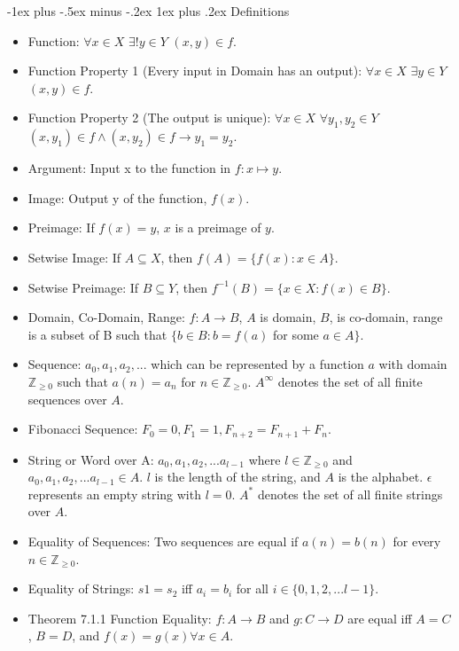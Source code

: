 \documentclass[10pt, portrait]{article}
\makeatletter
\renewcommand{\subsection}{\@startsection{subsection}{3}{0mm}%
                                {-1ex plus -.5ex minus -.2ex}%
                                {1ex plus .2ex}%
                                {\normalfont\small\bfseries}}%
\makeatother
\begin{document}
\begin{multicols*}{2}
\subsection{Definitions}
\begin{itemize}
    \item Function: $\forall x \in X$ $\exists! y \in Y$ $(x, y) \in f$.
    \item Function Property 1 (Every input in Domain has an output): $\forall x \in X$ $\exists y \in Y$ $(x, y) \in f$.
    \item Function Property 2 (The output is unique): $\forall x \in X$ $\forall y_1, y_2 \in Y$ $(x, y_1) \in f \land (x, y_2) \in f \rightarrow y_1 = y_2$.
    \item Argument: Input x to the function in $f: x \mapsto y$.
    \item Image: Output y of the function, $f(x)$.
    \item Preimage: If $f(x) = y$, $x$ is a preimage of $y$.
    \item Setwise Image: If $A \subseteq X$, then $f(A) = \{ f(x) : x \in A\}$.
    \item Setwise Preimage: If $B \subseteq Y$, then $f^{-1}(B) = \{x \in X : f(x) \in B\}$.
    \item Domain, Co-Domain, Range: $f : A \rightarrow B$, $A$ is domain, $B$, is co-domain, range is a subset of B such that $\{b \in B : b = f(a)$ for some $a \in A\}$.
    \item Sequence: $a_0, a_1, a_2, ...$ which can be represented by a function $a$ with domain $\mathbb{Z}_{\geq 0}$ such that $a(n) = a_n$ for $n \in \mathbb{Z}_{\geq 0}$. $A^{\infty}$ denotes the set of all finite sequences over $A$.
    \item Fibonacci Sequence: $F_0 = 0, F_1 = 1, F_{n+2} = F_{n+1} + F_n$.
    \item String or Word over A: $a_0, a_1, a_2, ... a_{l-1}$ where $l \in \mathbb{Z}_{\geq 0}$ and  $a_0, a_1, a_2, ... a_{l-1} \in A$. $l$ is the length of the string, and $A$ is the alphabet. $\epsilon$ represents an empty string with $l = 0$. $A^{*}$ denotes the set of all finite strings over $A$.
    \item Equality of Sequences: Two sequences are equal if $a(n) = b(n)$ for every $n \in \mathbb{Z}_{\geq 0}$.
    \item Equality of Strings: $s1 = s_2$ iff $a_i = b_i$ for all $i \in \{0, 1, 2, ... l-1\}$.
    \item Theorem 7.1.1 Function Equality: $f : A \rightarrow B$ and $g : C \rightarrow D$ are equal iff $A = C$, $B = D$, and $f(x) = g(x) \forall x \in A$.

\end{itemize}
\end{multicols*}
\end{document}

